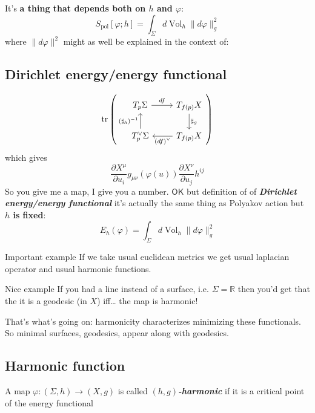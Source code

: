 It's \textbf{a thing that depends both on \(h\) and \(\varphi\)}: 
\[S_{\text{pol} }[\varphi;h]=\int_{\Sigma}d\operatorname{Vol}_h \|d\varphi\|_g^2\]
where \(\|d \varphi\|^2\) might as well be explained in the context of:

\subsection{Dirichlet energy/energy functional}

\[\operatorname{tr}\left(\begin{tikzcd}T_p\Sigma \arrow[r,"df"]&  T_{f(p)}X\arrow[d,"\sharp_g"]\\T_p^\vee \Sigma \arrow[u,"(\sharp_h)^{-1}"]&  T_{f(p)}X \arrow[l,"(df)^\vee"]\end{tikzcd}\right) \]
which gives
\[\frac{\partial X^\mu}{\partial u_i}g_{\mu\nu}(\varphi(u))\frac{\partial X^\nu}{\partial u_j}h^{ij}\]
So you give me a map, I give you a number. $\mathsf{OK}$ but definition of of \textit{\textbf{Dirichlet energy/energy functional}} it's actually the same thing as Polyakov action but \textbf{\(h\) is fixed}:
\[E_{h}(\varphi)=\int_{\Sigma}d\operatorname{Vol}_h \|d\varphi\|_g^2\]

\begin{thing8}{Important example}\leavevmode
If we take usual euclidean metrics we get usual laplacian operator and usual harmonic functions.
\end{thing8}

\begin{thing8}{Nice example}\leavevmode
If you had a line instead of a surface, i.e. \(\Sigma=\mathbb{R}\) then you'd get that the it is a geodesic (in \(X\)) iff… the map is harmonic!
\end{thing8}

\begin{upshot}\leavevmode
That's what's going on: harmonicity characterizes minimizing these functionals. So minimal surfaces, geodesics, appear along with geodesics.
\end{upshot}

\subsection{Harmonic function}

\begin{defn}\leavevmode
A map \(\varphi:(\Sigma,h) \to (X,g)\) is called \textit{\textbf{\((h,g)\)-harmonic}} if it is a critical point of the energy functional
\end{defn}

